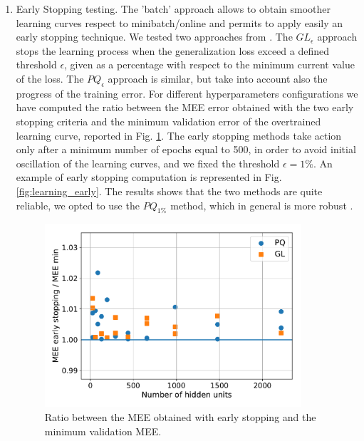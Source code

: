 \documentclass[11pt,twoside]{article}
\begin{document}
\begin{enumerate}
\item Early Stopping testing.
  The 'batch' approach allows to obtain smoother learning curves respect to minibatch/online and permits to apply easily an early stopping technique. We tested two approaches from \cite{early_stopping}.
  The $GL_{\epsilon}$ approach stops the learning process when the generalization loss exceed a defined threshold $\epsilon$, given as a percentage with respect to the minimum current value of the loss. The $PQ_{\epsilon}$ approach is similar, but take into account also the progress of the training error.
  For different hyperparameters configurations we have computed the ratio between the MEE error obtained with the two early stopping criteria and the minimum validation error of the overtrained learning curve, reported in Fig. \ref{fig:early_stop}. The early stopping methods take action only after a minimum number of epochs equal to 500, in order to avoid initial oscillation of the learning curves, and we fixed the threshold $\epsilon=1\%$. An example of early stopping computation is represented in Fig. \ref{fig:learning_early}. The results shows that the two methods are quite reliable, we opted to use the $PQ_{1\%}$ method, which in general is more robust \cite{early_stopping}.

  \begin{figure}[htbp]
    \centering
    \includegraphics[width=0.90\textwidth]{img/early_stop.pdf}
    \caption{Ratio between the MEE obtained with early stopping and the minimum validation MEE.}
    \label{fig:early_stop}
  \end{figure}


\end{enumerate}
\end{document}
